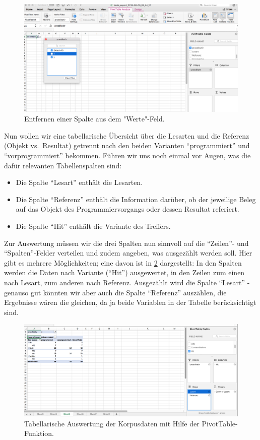 \documentclass[]{article}
\providecommand{\tightlist}{%
  \setlength{\itemsep}{0pt}\setlength{\parskip}{0pt}}
\begin{document}
\begin{figure}
\includegraphics[width=6.28in]{docs/fig/praedikativ_filter} \caption{Entfernen einer Spalte aus dem "Werte"-Feld.}\label{fig:praedikativfilter}
\end{figure}

Nun wollen wir eine tabellarische Übersicht über die Lesarten und die
Referenz (Objekt vs.~Resultat) getrennt nach den beiden Varianten
``programmiert'' und ``vorprogrammiert'' bekommen. Führen wir uns noch
einmal vor Augen, was die dafür relevanten Tabellenspalten sind:

\begin{itemize}
\tightlist
\item
  Die Spalte ``Lesart'' enthält die Lesarten.
\item
  Die Spalte ``Referenz'' enthält die Information darüber, ob der
  jeweilige Beleg auf das Objekt des Programmiervorgangs oder dessen
  Resultat referiert.
\item
  Die Spalte ``Hit'' enthält die Variante des Treffers.
\end{itemize}

Zur Auswertung müssen wir die drei Spalten nun sinnvoll auf die
``Zeilen''- und ``Spalten''-Felder verteilen und zudem angeben, was
ausgezählt werden soll. Hier gibt es mehrere Möglichkeiten; eine davon
ist in \ref{fig:excelfilter} dargestellt: In den Spalten werden die
Daten nach Variante (``Hit'') ausgewertet, in den Zeilen zum einen nach
Lesart, zum anderen nach Referenz. Ausgezählt wird die Spalte ``Lesart''
- genauso gut könnten wir aber auch die Spalte ``Referenz'' auszählen,
die Ergebnisse wären die gleichen, da ja beide Variablen in der Tabelle
berücksichtigt sind.

\begin{figure}
\includegraphics[width=6.36in]{docs/fig/excel_allfilters} \caption{Tabellarische Auswertung der Korpusdaten mit Hilfe der PivotTable-Funktion.}\label{fig:excelfilter}
\end{figure}
\end{document}

